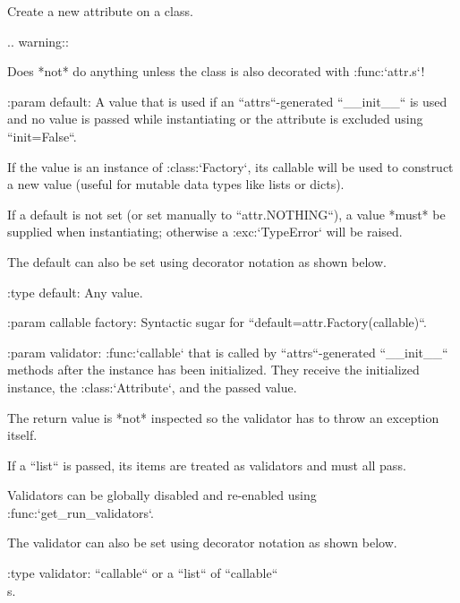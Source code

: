 \begin{DoxyVerb}Create a new attribute on a class.

..  warning::

    Does *not* do anything unless the class is also decorated with
    :func:`attr.s`!

:param default: A value that is used if an ``attrs``-generated ``__init__``
    is used and no value is passed while instantiating or the attribute is
    excluded using ``init=False``.

    If the value is an instance of :class:`Factory`, its callable will be
    used to construct a new value (useful for mutable data types like lists
    or dicts).

    If a default is not set (or set manually to ``attr.NOTHING``), a value
    *must* be supplied when instantiating; otherwise a :exc:`TypeError`
    will be raised.

    The default can also be set using decorator notation as shown below.

:type default: Any value.

:param callable factory: Syntactic sugar for
    ``default=attr.Factory(callable)``.

:param validator: :func:`callable` that is called by ``attrs``-generated
    ``__init__`` methods after the instance has been initialized.  They
    receive the initialized instance, the :class:`Attribute`, and the
    passed value.

    The return value is *not* inspected so the validator has to throw an
    exception itself.

    If a ``list`` is passed, its items are treated as validators and must
    all pass.

    Validators can be globally disabled and re-enabled using
    :func:`get_run_validators`.

    The validator can also be set using decorator notation as shown below.

:type validator: ``callable`` or a ``list`` of ``callable``\\ s.


\end{DoxyVerb}
